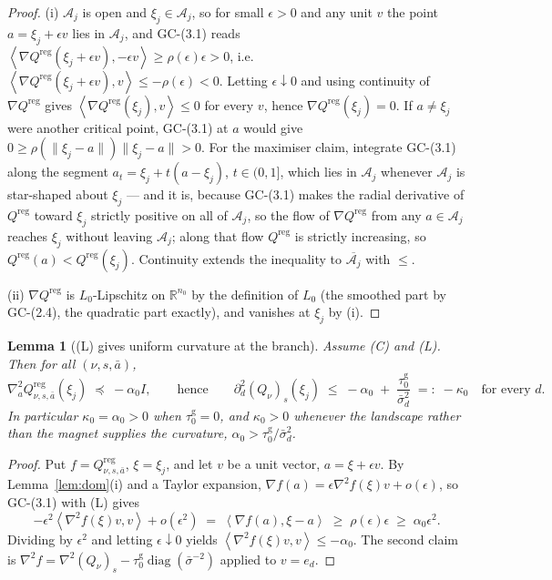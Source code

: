 \documentclass[11pt]{article}
\newtheorem{lemma}{Lemma}
\theoremstyle{definition}
\newcommand{\R}{\mathbb{R}}
\newcommand{\cA}{\mathcal{A}}
\newcommand{\ip}[2]{\left\langle #1, #2 \right\rangle}
\DeclareMathOperator{\diag}{diag}
\newcommand{\GC}[1]{\textsf{GC-#1}}
\begin{document}
\begin{proof}
(i) $\cA_j$ is open and $\xi_j \in \cA_j$, so for small $\epsilon > 0$ and any
unit $v$ the point $a = \xi_j + \epsilon v$ lies in $\cA_j$, and \GC{(3.1)}
reads $\ip{\nabla Q^{\mathrm{reg}}(\xi_j + \epsilon v)}{-\epsilon v} \ge
\rho(\epsilon)\epsilon > 0$, i.e.\
$\ip{\nabla Q^{\mathrm{reg}}(\xi_j + \epsilon v)}{v} \le -\rho(\epsilon) < 0$.
Letting $\epsilon \downarrow 0$ and using continuity of $\nabla Q^{\mathrm{reg}}$
gives $\ip{\nabla Q^{\mathrm{reg}}(\xi_j)}{v} \le 0$ for every $v$, hence
$\nabla Q^{\mathrm{reg}}(\xi_j) = 0$. If $a \ne \xi_j$ were another critical
point, \GC{(3.1)} at $a$ would give $0 \ge \rho(\|\xi_j - a\|)\|\xi_j - a\| > 0$.
For the maximiser claim, integrate \GC{(3.1)} along the segment
$a_t = \xi_j + t(a - \xi_j)$, $t \in (0,1]$, which lies in $\cA_j$ whenever
$\cA_j$ is star-shaped about $\xi_j$ --- and it is, because \GC{(3.1)} makes the
radial derivative of $Q^{\mathrm{reg}}$ toward $\xi_j$ strictly positive on all of
$\cA_j$, so the flow of $\nabla Q^{\mathrm{reg}}$ from any $a \in \cA_j$ reaches
$\xi_j$ without leaving $\cA_j$; along that flow $Q^{\mathrm{reg}}$ is strictly
increasing, so $Q^{\mathrm{reg}}(a) < Q^{\mathrm{reg}}(\xi_j)$. Continuity extends
the inequality to $\overline{\cA_j}$ with $\le$.

(ii) $\nabla Q^{\mathrm{reg}}$ is $L_0$-Lipschitz on $\R^{n_0}$ by the definition
of $L_0$ (the smoothed part by \GC{(2.4)}, the quadratic part exactly), and
vanishes at $\xi_j$ by (i).
\end{proof}

\begin{lemma}[(L) gives uniform curvature at the branch]\label{lem:curv}
Assume (C) and (L). Then for all $(\nu,s,\bar a)$,
\[
  \nabla^2_a Q^{\mathrm{reg}}_{\nu,s,\bar a}(\xi_j) \;\preceq\; -\alpha_0 I,
  \qquad\text{hence}\qquad
  \partial^2_d (Q_\nu)_s(\xi_j) \;\le\; -\alpha_0
  \;+\; \frac{\tau^{\mathrm g}_0}{\bar\sigma_{d}^2}
  \;=:\; -\kappa_0 \quad \text{for every } d .
\]
In particular $\kappa_0 = \alpha_0 > 0$ when $\tau^{\mathrm g}_0 = 0$, and
$\kappa_0 > 0$ whenever the landscape rather than the magnet supplies the
curvature, $\alpha_0 > \tau^{\mathrm g}_0/\bar\sigma_d^2$.
\end{lemma}

\begin{proof}
Put $f = Q^{\mathrm{reg}}_{\nu,s,\bar a}$, $\xi = \xi_j$, and let $v$ be a unit
vector, $a = \xi + \epsilon v$. By Lemma~\ref{lem:dom}(i) and a Taylor expansion,
$\nabla f(a) = \epsilon \nabla^2 f(\xi) v + o(\epsilon)$, so \GC{(3.1)} with (L)
gives
\[
  -\epsilon^2 \ip{\nabla^2 f(\xi) v}{v} + o(\epsilon^2)
  \;=\; \ip{\nabla f(a)}{\xi - a}
  \;\ge\; \rho(\epsilon)\epsilon \;\ge\; \alpha_0 \epsilon^2 .
\]
Dividing by $\epsilon^2$ and letting $\epsilon \downarrow 0$ yields
$\ip{\nabla^2 f(\xi)v}{v} \le -\alpha_0$. The second claim is
$\nabla^2 f = \nabla^2 (Q_\nu)_s - \tau^{\mathrm g}_0 \diag(\bar\sigma^{-2})$
applied to $v = e_d$.
\end{proof}
\end{document}
